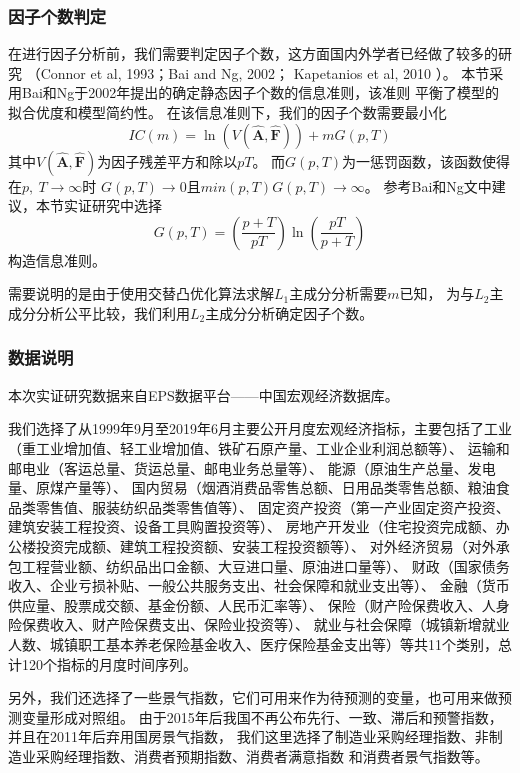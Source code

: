 \subsubsection{因子个数判定}
在进行因子分析前，我们需要判定因子个数，这方面国内外学者已经做了较多的研究
（Connor et al, 1993\cite{connor1993test}；Bai and Ng, 2002\cite{bai2002determining}；
Kapetanios et al, 2010\cite{kapetanios2010testing}
）。
本节采用Bai和Ng于2002年提出的确定静态因子个数的信息准则，该准则
平衡了模型的拟合优度和模型简约性。
在该信息准则下，我们的因子个数需要最小化
\begin{equation}\label{number}
    IC(m) = \ln(V(\hat{\bm{A}}, \hat{\bm{F}})) + mG(p, T)
\end{equation}
其中$V(\hat{\bm{A}}, \hat{\bm{F}})$为因子残差平方和除以$pT$。
而$G(p,T)$为一惩罚函数，该函数使得在$p,\ T \rightarrow \infty$时
$G(p, T) \rightarrow 0$且$min(p, T)G(p,T) \rightarrow \infty$。
参考Bai和Ng文中建议，本节实证研究中选择
$$
    G(p, T) = (\frac{p + T}{pT})\ln(\frac{pT}{p + T})
$$
构造信息准则。

需要说明的是由于使用交替凸优化算法求解$L_1$主成分分析需要$m$已知，
为与$L_2$主成分分析公平比较，我们利用$L_2$主成分分析确定因子个数。

\subsubsection{数据说明}
本次实证研究数据来自EPS数据平台——中国宏观经济数据库。

我们选择了从1999年9月至2019年6月主要公开月度宏观经济指标，主要包括了工业（重工业增加值、轻工业增加值、铁矿石原产量、工业企业利润总额等）、
运输和邮电业（客运总量、货运总量、邮电业务总量等）、
能源（原油生产总量、发电量、原煤产量等）、
国内贸易（烟酒消费品零售总额、日用品类零售总额、粮油食品类零售值、服装纺织品类零售值等）、
固定资产投资（第一产业固定资产投资、建筑安装工程投资、设备工具购置投资等）、
房地产开发业（住宅投资完成额、办公楼投资完成额、建筑工程投资额、安装工程投资额等）、
对外经济贸易（对外承包工程营业额、纺织品出口金额、大豆进口量、原油进口量等）、
财政（国家债务收入、企业亏损补贴、一般公共服务支出、社会保障和就业支出等）、
金融（货币供应量、股票成交额、基金份额、人民币汇率等）、
保险（财产险保费收入、人身险保费收入、财产险保费支出、保险业投资等）、
就业与社会保障（城镇新增就业人数、城镇职工基本养老保险基金收入、医疗保险基金支出等）等共11个类别，总计120个指标的月度时间序列。

另外，我们还选择了一些景气指数，它们可用来作为待预测的变量，也可用来做预测变量形成对照组。
由于2015年后我国不再公布先行、一致、滞后和预警指数，并且在2011年后弃用国房景气指数，
我们这里选择了制造业采购经理指数、非制造业采购经理指数、消费者预期指数、消费者满意指数
和消费者景气指数等。

